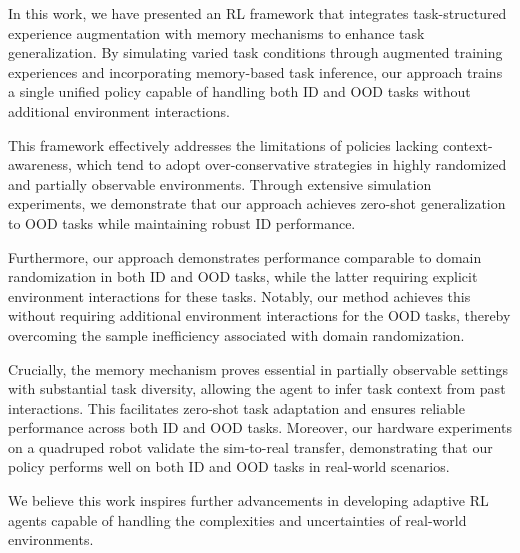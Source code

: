 In this work, we have presented an RL framework that integrates task-structured experience augmentation with memory mechanisms to enhance task generalization. 
By simulating varied task conditions through augmented training experiences and incorporating memory-based task inference, our approach trains a single unified policy capable of handling both ID and OOD tasks without additional environment interactions.

This framework effectively addresses the limitations of policies lacking context-awareness, which tend to adopt over-conservative strategies in highly randomized and partially observable environments.
Through extensive simulation experiments, we demonstrate that our approach achieves zero-shot generalization to OOD tasks while maintaining robust ID performance. 

Furthermore, our approach demonstrates performance comparable to domain randomization in both ID and OOD tasks, while the latter requiring explicit environment interactions for these tasks. 
Notably, our method achieves this without requiring additional environment interactions for the OOD tasks, thereby overcoming the sample inefficiency associated with domain randomization.

Crucially, the memory mechanism proves essential in partially observable settings with substantial task diversity, allowing the agent to infer task context from past interactions. 
This facilitates zero-shot task adaptation and ensures reliable performance across both ID and OOD tasks. 
Moreover, our hardware experiments on a quadruped robot validate the sim-to-real transfer, demonstrating that our policy performs well on both ID and OOD tasks in real-world scenarios.

We believe this work inspires further advancements in developing adaptive RL agents capable of handling the complexities and uncertainties of real-world environments.
